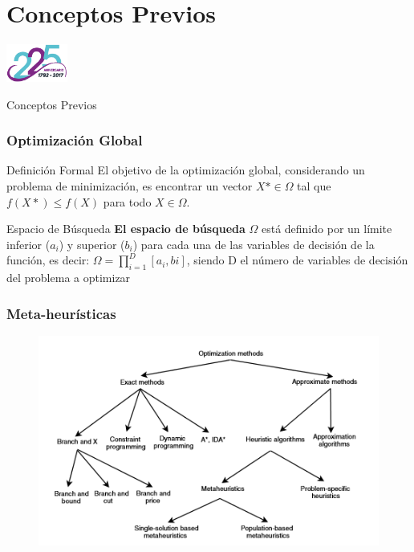
\section{Conceptos Previos}

\begin{frame}
  \centering
  \includegraphics[width=0.15\textwidth]{img/ullesc.eps}
  \begin{scriptsize}
    \begin{center}
    \Huge{Conceptos Previos}
    \end{center}
  \end{scriptsize}
\end{frame}
\begin{frame}
    \frametitle{Optimización Global}
    \begin{block}{Definición Formal}
    El objetivo de la optimización global, considerando un problema de minimización, es encontrar un vector $X* \in \Omega$ tal que $f(X*) \leq f(X)$ para todo $X \in \Omega$.
    \end{block}
    \begin{block}{Espacio de Búsqueda}
    \textbf{El espacio de búsqueda} $\Omega$ está definido por un límite inferior ($a_{i}$) y superior ($b_{i}$) para cada una de las variables de decisión de la función, es decir: $\Omega = \prod^{D}_{i=1}[a_{i}, b{i}]$, siendo D el número de variables de decisión del problema a optimizar \citep{Segredo2017}
    \end{block}
\end{frame}

\begin{frame} %
\frametitle{Meta-heurísticas}
\begin{figure}
  \centering
	\includegraphics[scale=0.25]{img/meta}
\end{figure}
\end{frame}

